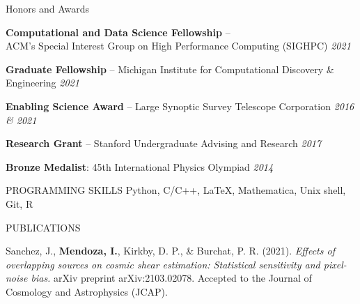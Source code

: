 \documentclass{resume} %
\begin{document}
\begin{rSection}{Honors and Awards} \itemsep -3pt \vspace*{-.25cm}

\item \textbf{Computational and Data Science Fellowship} -- \\ ACM’s Special Interest Group on High Performance Computing (SIGHPC) \hfill {\em 2021}

\item \textbf{Graduate Fellowship} -- Michigan Institute for Computational Discovery \& Engineering  \hfill {\em 2021}

\item \textbf{Enabling Science Award} -- Large Synoptic Survey Telescope Corporation \hfill {\em 2016 \& 2021}

\item \textbf{Research Grant} -- Stanford Undergraduate Advising and Research \hfill {\em 2017}

\item \textbf{Bronze Medalist}: 45th International Physics Olympiad \hfill {\em 2014}
\end{rSection}
\begin{rSection}{PROGRAMMING SKILLS}
%
Python, C/C++, \LaTeX, Mathematica, Unix shell, Git, R
\end{rSection}


\begin{rSection}{PUBLICATIONS}
%
\vspace*{-1em}
\item Sanchez, J., \textbf{Mendoza, I.}, Kirkby, D. P., \& Burchat, P. R. (2021). \textit{Effects of overlapping sources on cosmic shear estimation: Statistical sensitivity and pixel-noise bias.} arXiv preprint arXiv:2103.02078. Accepted to the Journal of Cosmology and Astrophysics (JCAP).
\end{rSection}


\end{document}
